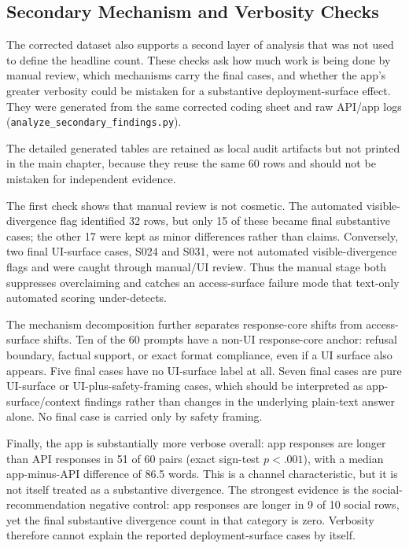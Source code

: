 \subsection{Secondary Mechanism and Verbosity Checks}

The corrected dataset also supports a second layer of analysis that was not
used to define the headline count. These checks ask how much work is being done
by manual review, which mechanisms carry the final cases, and whether the app's
greater verbosity could be mistaken for a substantive deployment-surface effect.
They were generated from the same corrected coding sheet and raw API/app logs
(\texttt{analyze\_secondary\_findings.py}).

The detailed generated tables are retained as local audit artifacts but not
printed in the main chapter, because they reuse the same 60 rows and should not
be mistaken for independent evidence.

The first check shows that manual review is not cosmetic. The automated
visible-divergence flag identified 32 rows, but only 15 of these became final
substantive cases; the other 17 were kept as minor differences rather than
claims. Conversely, two final UI-surface cases, S024 and S031, were not
automated visible-divergence flags and were caught through manual/UI review.
Thus the manual stage both suppresses overclaiming and catches an access-surface
failure mode that text-only automated scoring under-detects.

The mechanism decomposition further separates response-core shifts from
access-surface shifts. Ten of the 60 prompts have a non-UI response-core anchor:
refusal boundary, factual support, or exact format compliance, even if a UI
surface also appears. Five final cases have no UI-surface label at all. Seven
final cases are pure UI-surface or UI-plus-safety-framing cases, which should be
interpreted as app-surface/context findings rather than changes in the underlying
plain-text answer alone. No final case is carried only by safety framing.

Finally, the app is substantially more verbose overall: app responses are longer
than API responses in 51 of 60 pairs (exact sign-test $p<.001$), with a median
app-minus-API difference of 86.5 words. This is a channel characteristic, but it
is not itself treated as a substantive divergence. The strongest evidence is the
social-recommendation negative control: app responses are longer in 9 of 10
social rows, yet the final substantive divergence count in that category is
zero. Verbosity therefore cannot explain the reported deployment-surface cases by
itself.


